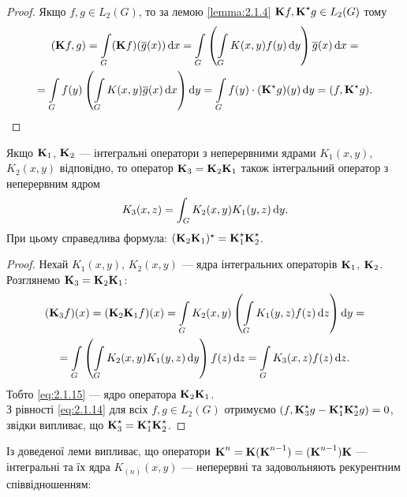 \begin{proof}
	Якщо $f, g \in L_2(G)$, то за лемою \ref{lemma:2.1.4} $\bf{K}f, \bf{K}^\star g \in L_2(G)$ тому
	\begin{multline*}
		(\bf{K}f, g) = \Int_G (\bf{K}f)(\overline g(x)) \diff x = \Int_G \left( \Int_G K(x, y) f(y) \diff y\right) \overline{g}(x) \diff x = \\
		= \Int_G f(y) \left( \Int_G K(x, y) \overline g(x) \diff x\right) \diff y = \Int_G f(y) \cdot (\bf{K}^\star  g)(y) \diff y = (f, \bf{K}^\star g).
	\end{multline*}
\end{proof}

\begin{lemma}
	Якщо $\bf{K}_1$, $\bf{K}_2$ --- інтегральні оператори з неперервними ядрами $K_1(x, y)$, $K_2(x, y)$ відповідно, то оператор $\bf{K}_3 = \bf{K}_2 \bf{K}_1$ також інтегральний оператор з неперервним ядром
	\begin{equation}
		\label{eq:2.1.15}
		K_3(x, z) = \int_G K_2(x, y) K_1(y, z) \diff y.
	\end{equation}
	При цьому справедлива формула: $(\bf{K}_2\bf{K}_1)^\star  = \bf{K}_1^\star  \bf{K}_2^\star $.
\end{lemma}

\begin{proof}
	Нехай $K_1(x, y)$, $K_2(x, y)$ --- ядра інтегральних операторів $\bf{K}_1$, $\bf{K}_2$. Розглянемо $\bf{K}_3 = \bf{K}_2 \bf{K}_1$:
	\begin{multline*}
		(\bf{K}_3 f)(x) = (\bf{K}_2\bf{K}_1f)(x) = \Int_G K_2(x, y) \left( \Int_G K_1(y, z) f(z) \diff z \right) \diff y = \\
		= \Int_G \left( \Int_G K_2(x, y) K_1(y, z) \diff y\right) f(z) \diff z = \Int_G K_3(x, z) f(z) \diff z.
	\end{multline*}
	Тобто \eqref{eq:2.1.15} --- ядро оператора $\bf{K}_2\bf{K}_1$. \\

	З рівності \eqref{eq:2.1.14} для всіх $f, g \in L_2(G)$ отримуємо $(f, \bf{K}_3^\star g - \bf{K}_1^\star  \bf{K}_2^\star  g) = 0$, звідки випливає, що $\bf{K}_3^\star  = \bf{K}_1^\star  \bf{K}_2^\star $.
\end{proof}

Із доведеної леми випливає, що оператори $\bf{K}^n = \bf{K} (\bf{K}^{n - 1}) = (\bf{K}^{n - 1})\bf{K}$ --- інтегральні та їх ядра $K_{(n)}(x, y)$ --- неперервні та задовольняють рекурентним співвідношенням:


